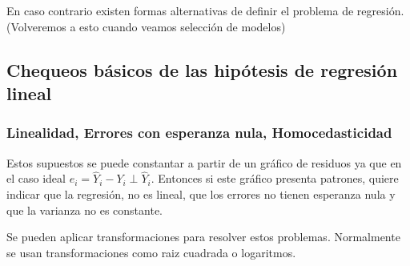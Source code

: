 \documentclass[
  12pt,
]{book}
\providecommand{\tightlist}{%
  \setlength{\itemsep}{0pt}\setlength{\parskip}{0pt}}
\begin{document}
\begin{description}
\tightlist
\item[Más observaciones que predictores]
En caso contrario existen formas alternativas de definir el problema de
regresión. (Volveremos a esto cuando veamos selección de modelos)
\end{description}

\hypertarget{chequeos-buxe1sicos-de-las-hipuxf3tesis-de-regresiuxf3n-lineal}{%
\subsection{Chequeos básicos de las hipótesis de regresión
lineal}\label{chequeos-buxe1sicos-de-las-hipuxf3tesis-de-regresiuxf3n-lineal}}

\hypertarget{linealidad-errores-con-esperanza-nula-homocedasticidad}{%
\subsubsection{Linealidad, Errores con esperanza nula,
Homocedasticidad}\label{linealidad-errores-con-esperanza-nula-homocedasticidad}}

Estos supuestos se puede constantar a partir de un gráfico de residuos
ya que en el caso ideal
\(e_{i} = \hat{Y}_{i}- Y_{i} \perp \hat{Y}_{i}\). Entonces si este
gráfico presenta patrones, quiere indicar que la regresión, no es
lineal, que los errores no tienen esperanza nula y que la varianza no es
constante.

Se pueden aplicar transformaciones para resolver estos problemas.
Normalmente se usan transformaciones como raiz cuadrada o logaritmos.
\end{document}
